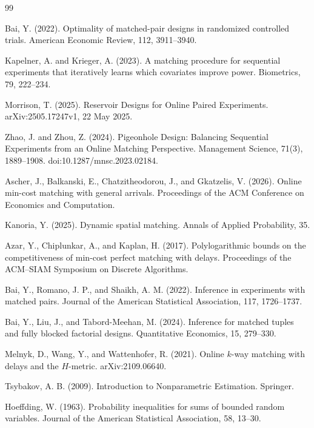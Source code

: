 \documentclass{article}
\begin{document}
\begin{thebibliography}{99}

   Bai, Y. (2022). Optimality of matched-pair designs in randomized controlled trials. American Economic Review, 112, 3911--3940.

   Kapelner, A. and Krieger, A. (2023). A matching procedure for sequential experiments that iteratively learns which covariates improve power. Biometrics, 79, 222--234.

   Morrison, T. (2025). Reservoir Designs for Online Paired Experiments. arXiv:2505.17247v1, 22 May 2025.

   Zhao, J. and Zhou, Z. (2024). Pigeonhole Design: Balancing Sequential Experiments from an Online Matching Perspective. Management Science, 71(3), 1889--1908. doi:10.1287/mnsc.2023.02184.

   Ascher, J., Balkanski, E., Chatzitheodorou, J., and Gkatzelis, V. (2026). Online min-cost matching with general arrivals. Proceedings of the ACM Conference on Economics and Computation.

   Kanoria, Y. (2025). Dynamic spatial matching. Annals of Applied Probability, 35.

   Azar, Y., Chiplunkar, A., and Kaplan, H. (2017). Polylogarithmic bounds on the competitiveness of min-cost perfect matching with delays. Proceedings of the ACM--SIAM Symposium on Discrete Algorithms.

   Bai, Y., Romano, J. P., and Shaikh, A. M. (2022). Inference in experiments with matched pairs. Journal of the American Statistical Association, 117, 1726--1737.

   Bai, Y., Liu, J., and Tabord-Meehan, M. (2024). Inference for matched tuples and fully blocked factorial designs. Quantitative Economics, 15, 279--330.

   Melnyk, D., Wang, Y., and Wattenhofer, R. (2021). Online \(k\)-way matching with delays and the \(H\)-metric. arXiv:2109.06640.

   Tsybakov, A. B. (2009). Introduction to Nonparametric Estimation. Springer.

   Hoeffding, W. (1963). Probability inequalities for sums of bounded random variables. Journal of the American Statistical Association, 58, 13--30.

\end{thebibliography}
\end{document}
